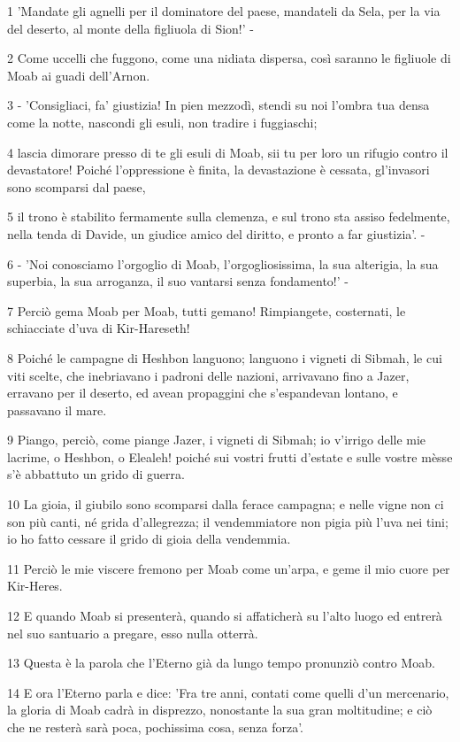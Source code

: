 \par 1 'Mandate gli agnelli per il dominatore del paese, mandateli da Sela, per la via del deserto, al monte della figliuola di Sion!' -
\par 2 Come uccelli che fuggono, come una nidiata dispersa, così saranno le figliuole di Moab ai guadi dell'Arnon.
\par 3 - 'Consigliaci, fa' giustizia! In pien mezzodì, stendi su noi l'ombra tua densa come la notte, nascondi gli esuli, non tradire i fuggiaschi;
\par 4 lascia dimorare presso di te gli esuli di Moab, sii tu per loro un rifugio contro il devastatore! Poiché l'oppressione è finita, la devastazione è cessata, gl'invasori sono scomparsi dal paese,
\par 5 il trono è stabilito fermamente sulla clemenza, e sul trono sta assiso fedelmente, nella tenda di Davide, un giudice amico del diritto, e pronto a far giustizia'. -
\par 6 - 'Noi conosciamo l'orgoglio di Moab, l'orgogliosissima, la sua alterigia, la sua superbia, la sua arroganza, il suo vantarsi senza fondamento!' -
\par 7 Perciò gema Moab per Moab, tutti gemano! Rimpiangete, costernati, le schiacciate d'uva di Kir-Hareseth!
\par 8 Poiché le campagne di Heshbon languono; languono i vigneti di Sibmah, le cui viti scelte, che inebriavano i padroni delle nazioni, arrivavano fino a Jazer, erravano per il deserto, ed avean propaggini che s'espandevan lontano, e passavano il mare.
\par 9 Piango, perciò, come piange Jazer, i vigneti di Sibmah; io v'irrigo delle mie lacrime, o Heshbon, o Elealeh! poiché sui vostri frutti d'estate e sulle vostre mèsse s'è abbattuto un grido di guerra.
\par 10 La gioia, il giubilo sono scomparsi dalla ferace campagna; e nelle vigne non ci son più canti, né grida d'allegrezza; il vendemmiatore non pigia più l'uva nei tini; io ho fatto cessare il grido di gioia della vendemmia.
\par 11 Perciò le mie viscere fremono per Moab come un'arpa, e geme il mio cuore per Kir-Heres.
\par 12 E quando Moab si presenterà, quando si affaticherà su l'alto luogo ed entrerà nel suo santuario a pregare, esso nulla otterrà.
\par 13 Questa è la parola che l'Eterno già da lungo tempo pronunziò contro Moab.
\par 14 E ora l'Eterno parla e dice: 'Fra tre anni, contati come quelli d'un mercenario, la gloria di Moab cadrà in disprezzo, nonostante la sua gran moltitudine; e ciò che ne resterà sarà poca, pochissima cosa, senza forza'.

